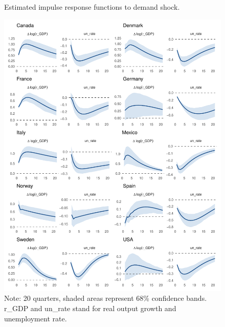 \documentclass[12pt, a4paper]{article}
\begin{document}
\begin{figure}[H]
    \caption{Estimated impulse response functions to demand shock.}
    \label{fig:var_impulses_demand}
    \centering
    \includegraphics[width=\textwidth, height=0.9\textheight, keepaspectratio]{Figures/all_demand.pdf}
    \caption*{Note: 20 quarters, shaded areas represent 68\% confidence bands. r\_GDP and un\_rate stand for real output growth and unemployment rate.}
\end{figure}
\end{document}
